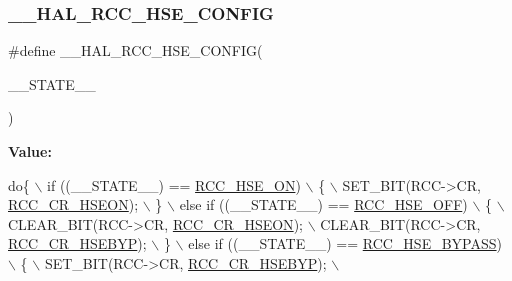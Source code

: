 \subsubsection{\texorpdfstring{\+\_\+\+\_\+\+H\+A\+L\+\_\+\+R\+C\+C\+\_\+\+H\+S\+E\+\_\+\+C\+O\+N\+F\+IG}{\_\_HAL\_RCC\_HSE\_CONFIG}}
{\footnotesize\ttfamily \#define \+\_\+\+\_\+\+H\+A\+L\+\_\+\+R\+C\+C\+\_\+\+H\+S\+E\+\_\+\+C\+O\+N\+F\+IG(\begin{DoxyParamCaption}\item[{}]{\+\_\+\+\_\+\+S\+T\+A\+T\+E\+\_\+\+\_\+ }\end{DoxyParamCaption})}

{\bfseries Value\+:}
\begin{DoxyCode}
\textcolor{keywordflow}{do}\{                                                     \(\backslash\)
                      if ((\_\_STATE\_\_) == \hyperlink{group___r_c_c___h_s_e___config_gabc4f70a44776c557af20496b04d9a9db}{RCC\_HSE\_ON})                        \(\backslash\)
                      \{                                                     \(\backslash\)
                        SET\_BIT(RCC->CR, \hyperlink{group___peripheral___registers___bits___definition_gadb8228c9020595b4cf9995137b8c9a7d}{RCC\_CR\_HSEON});                     \(\backslash\)
                      \}                                                     \(\backslash\)
                      else \textcolor{keywordflow}{if} ((\_\_STATE\_\_) == \hyperlink{group___r_c_c___h_s_e___config_ga1616626d23fbce440398578855df6f97}{RCC\_HSE\_OFF})                  \(\backslash\)
                      \{                                                     \(\backslash\)
                        CLEAR\_BIT(RCC->CR, \hyperlink{group___peripheral___registers___bits___definition_gadb8228c9020595b4cf9995137b8c9a7d}{RCC\_CR\_HSEON});                   \(\backslash\)
                        CLEAR\_BIT(RCC->CR, \hyperlink{group___peripheral___registers___bits___definition_gaa3288090671af5a959aae4d7f7696d55}{RCC\_CR\_HSEBYP});                  \(\backslash\)
                      \}                                                     \(\backslash\)
                      else \textcolor{keywordflow}{if} ((\_\_STATE\_\_) == \hyperlink{group___r_c_c___h_s_e___config_ga5ca515db2d5c4d5bdb9ee3d154df2704}{RCC\_HSE\_BYPASS})               \(\backslash\)
                      \{                                                     \(\backslash\)
                        SET\_BIT(RCC->CR, \hyperlink{group___peripheral___registers___bits___definition_gaa3288090671af5a959aae4d7f7696d55}{RCC\_CR\_HSEBYP});                    \(\backslash\)

\end{DoxyCode}
